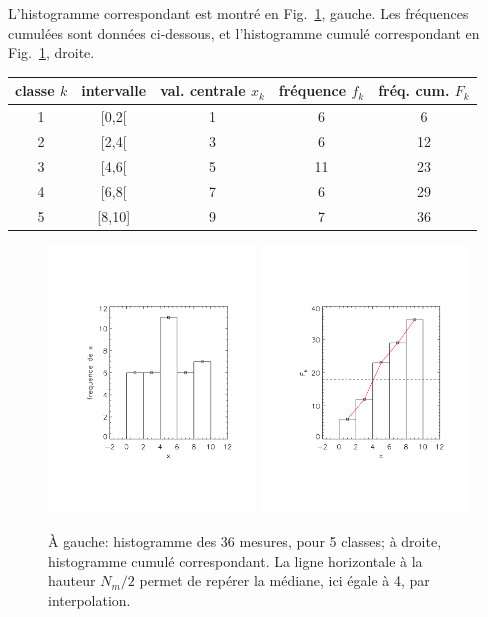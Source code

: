 L'histogramme correspondant est montré en Fig.~\ref{fig:hcapoabdc}, gauche. Les fréquences cumulées sont données ci-dessous, et l'histogramme cumulé correspondant en Fig.~\ref{fig:hcapoabdc}, droite.
\begin{center}
    \begin{tabular}{ccccc}
        classe $k$ & intervalle & val. centrale $x_k$ & fréquence $f_k$ & fréq. cum. $F_k$ \\\hline
        1          & [0,2[      & 1                   & 6               & 6                \\
        2          & [2,4[      & 3                   & 6               & 12               \\
        3          & [4,6[      & 5                   & 11              & 23               \\
        4          & [6,8[      & 7                   & 6               & 29               \\
        5          & [8,10]     & 9                   & 7               & 36               \\\hline
    \end{tabular}
\end{center}
\begin{figure}[h]
    \centering
    \includegraphics[width=5.5cm]{assets/figures/hist5classes.pdf}\hspace{5mm}
    \includegraphics[width=5.5cm]{assets/figures/histCumul5classes.pdf}
    \caption{À gauche: histogramme des 36 mesures, pour 5 classes; à droite, histogramme cumulé correspondant. La ligne horizontale à la hauteur $N_m/2$ permet de repérer la médiane, ici égale à 4, par interpolation.}
    \label{fig:hcapoabdc}
\end{figure}
